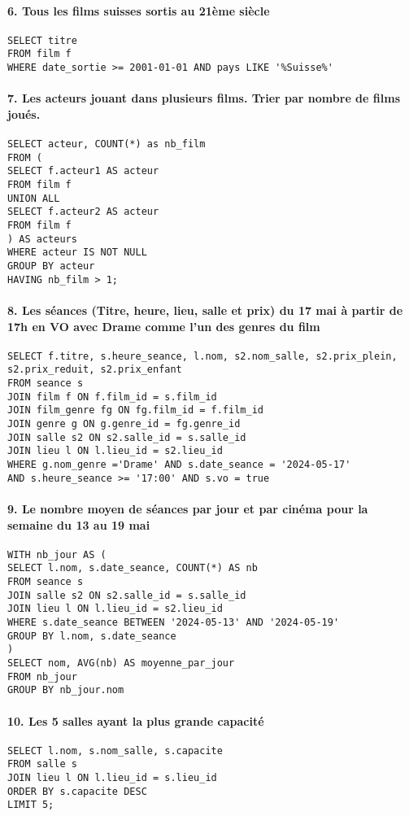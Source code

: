 \documentclass[12pt]{article}
\begin{document}
\paragraph*{6. Tous les films suisses sortis au 21ème siècle}
\begin{verbatim}
SELECT titre 
FROM film f  
WHERE date_sortie >= 2001-01-01 AND pays LIKE '%Suisse%' 
\end{verbatim}
\pagebreak
\paragraph*{7. Les acteurs jouant dans plusieurs films. Trier par nombre de films joués.}
\begin{verbatim}
SELECT acteur, COUNT(*) as nb_film  
FROM (  
SELECT f.acteur1 AS acteur  
FROM film f  
UNION ALL  
SELECT f.acteur2 AS acteur  
FROM film f  
) AS acteurs  
WHERE acteur IS NOT NULL  
GROUP BY acteur  
HAVING nb_film > 1; 
\end{verbatim}
\paragraph*{8. Les séances (Titre, heure, lieu, salle et prix) du 17 mai à partir de 17h en VO avec Drame comme l'un des genres du film}
\begin{verbatim}
SELECT f.titre, s.heure_seance, l.nom, s2.nom_salle, s2.prix_plein, 
s2.prix_reduit, s2.prix_enfant  
FROM seance s  
JOIN film f ON f.film_id = s.film_id  
JOIN film_genre fg ON fg.film_id = f.film_id  
JOIN genre g ON g.genre_id = fg.genre_id  
JOIN salle s2 ON s2.salle_id = s.salle_id  
JOIN lieu l ON l.lieu_id = s2.lieu_id  
WHERE g.nom_genre ='Drame' AND s.date_seance = '2024-05-17' 
AND s.heure_seance >= '17:00' AND s.vo = true 
\end{verbatim}
\pagebreak
\paragraph*{9. Le nombre moyen de séances par jour et par cinéma pour la semaine du 13 au 19 mai}
\begin{verbatim}
WITH nb_jour AS ( 
SELECT l.nom, s.date_seance, COUNT(*) AS nb 
FROM seance s  
JOIN salle s2 ON s2.salle_id = s.salle_id 
JOIN lieu l ON l.lieu_id = s2.lieu_id 
WHERE s.date_seance BETWEEN '2024-05-13' AND '2024-05-19' 
GROUP BY l.nom, s.date_seance  
) 
SELECT nom, AVG(nb) AS moyenne_par_jour 
FROM nb_jour 
GROUP BY nb_jour.nom
\end{verbatim}
\paragraph*{10. Les 5 salles ayant la plus grande capacité}
\begin{verbatim}
SELECT l.nom, s.nom_salle, s.capacite  
FROM salle s  
JOIN lieu l ON l.lieu_id = s.lieu_id  
ORDER BY s.capacite DESC 
LIMIT 5; 
\end{verbatim}
\end{document}
